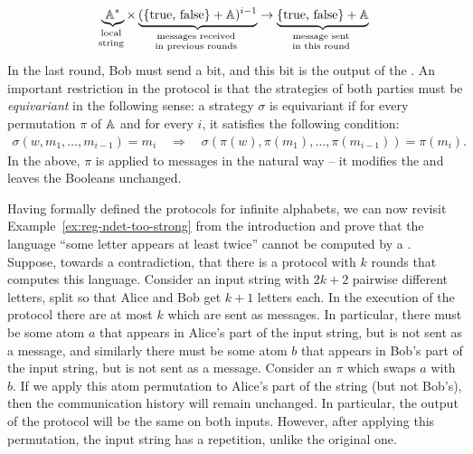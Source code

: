 \begin{align*}
\myunderbrace{\atoms^*}{local \\ string} \times \myunderbrace{(\set{\text{true, false}} + \atoms)^{i-1}}{messages received \\ in previous rounds} 
\to
\myunderbrace{\set{\text{true, false}} + \atoms}{message sent \\ in this round}
\end{align*}
In the last round, Bob must send a bit, and this bit is the output of the .
An important restriction in the protocol is that the strategies of both parties must be \emph{equivariant} in the following sense: 
a strategy $\sigma$ is equivariant if for every permutation $\pi$ of $\mathbb A$ and for every $i$, it satisfies the following condition:
\begin{align*}
\sigma(w, m_1, \ldots, m_{i-1}) = m_i 
\quad \Rightarrow \quad
\sigma(\pi(w), \pi(m_1), \ldots, \pi(m_{i-1})) = \pi(m_i).
\end{align*}
In the above, $\pi$ is applied to messages in the natural way -- 
it modifies the  and leaves the Booleans unchanged.

\begin{myexample}
\label{ex:protocol-not-repetitions}
    Having formally defined the protocols for infinite alphabets,
    we can now revisit Example~\ref{ex:reg-ndet-too-strong} from the introduction
    and prove that the language ``some letter appears at least twice'' cannot be computed by a
    . 
    Suppose, towards a contradiction, that there is a protocol with
    $k$ rounds that computes this language. Consider an input string with
    $2k+2$ pairwise different letters, split so that Alice and Bob get $k+1$
    letters each. In the execution of the protocol there are at most $k$ 
    which are sent as messages. In particular, there must be some atom $a$ that
    appears in Alice's part of the input string, but is not sent as a message,
    and similarly there must be some atom $b$ that appears in Bob's part of the
    input string, but is not sent as a message. Consider an 
    $\pi$ which swaps $a$ with $b$. If we apply this atom permutation to
    Alice's part of the string (but not Bob's), then the communication history
    will remain unchanged. In particular, the output of the protocol will be
    the same on both inputs. However, after applying this permutation, the
    input string has a repetition, unlike the original one. 
\end{myexample}


